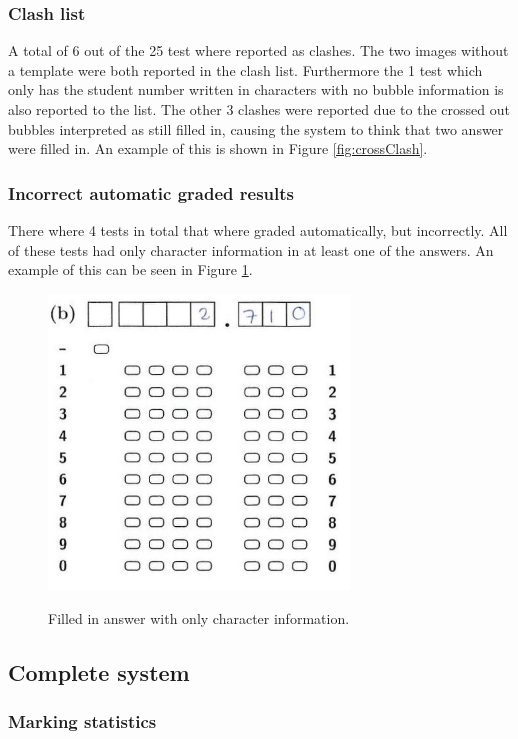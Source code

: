 \subsubsection{Clash list}

A total of 6 out of the 25 test where reported as clashes. The two images without a template were both reported in the clash list. Furthermore the 1 test which only has the student number written in characters with no bubble information is also reported to the list. The other 3 clashes were reported due to the crossed out bubbles interpreted as still filled in, causing the system to think that two answer were filled in. An example of this is shown in Figure \ref{fig:crossClash}.

\subsubsection{Incorrect automatic graded results}

There where 4 tests in total that where graded automatically, but incorrectly. All of these tests had only character information in at least one of the answers. An example of this can be seen in Figure \ref{fig:OnlyCharacters}.

\begin{figure}
  \centering
  \includegraphics[width=8cm]{OnlyCharacters}\\
  \caption{Filled in answer with only character information.}
  \label{fig:OnlyCharacters}
\end{figure}

\subsection{Complete system}

\subsubsection{Marking statistics}

